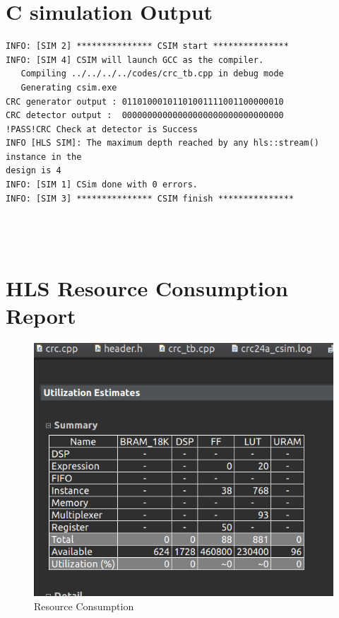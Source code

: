 \documentclass{article}
\begin{document}
\section{C simulation Output}
\begin{lstlisting}
INFO: [SIM 2] *************** CSIM start ***************
INFO: [SIM 4] CSIM will launch GCC as the compiler.
   Compiling ../../../../codes/crc_tb.cpp in debug mode
   Generating csim.exe
CRC generator output : 01101000101101001111001100000010
CRC detector output :  00000000000000000000000000000000
!PASS!CRC Check at detector is Success
INFO [HLS SIM]: The maximum depth reached by any hls::stream() instance in the
design is 4
INFO: [SIM 1] CSim done with 0 errors.
INFO: [SIM 3] *************** CSIM finish ***************




\end{lstlisting}
\vspace{15cm}

\section{HLS Resource Consumption Report}
\vspace{1cm}
\begin{figure}[h]
\centering
\includegraphics[width=\textwidth]{figs/p11.png}
    \caption{Resource Consumption}
    \label{fig:my_label}
\end{figure}

\vspace{13cm}
\end{document}
